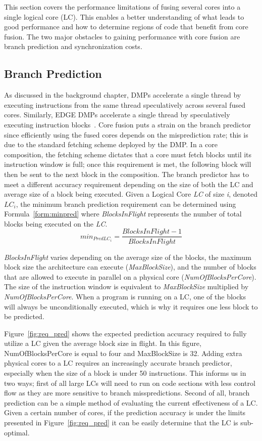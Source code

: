 This section covers the performance limitations of fusing several cores into a single logical core (LC).
This enables a better understanding of what leads to good performance and how to determine regions of code that benefit from core fusion.
The two major obstacles to gaining performance with core fusion are branch prediction and synchronization costs.

\subsection{Branch Prediction}

As discussed in the background chapter, DMPs accelerate a single thread by executing instructions from the same thread speculatively across several fused cores. 
Similarly, EDGE DMPs accelerate a single thread by speculatively executing instruction blocks~\cite{putnam2010e2}.
Core fusion puts a strain on the branch predictor since efficiently using the fused cores depends on the misprediction rate; this is due to the standard fetching scheme deployed by the DMP.
In a core composition, the fetching scheme dictates that a core must fetch blocks until its instruction window is full; once this requirement is met, the following block will then be sent to the next block in the composition.
The branch predictor has to meet a different accuracy requirement depending on the size of both the LC and average size of a block being executed.
Given a Logical Core \textit{LC} of size \textit{i}, denoted \textit{$LC_i$}, the minimum branch prediction requirement can be determined using Formula~\ref{form:minpred} where \textit{BlocksInFlight} represents the number of total blocks being executed on the \textit{LC}.
\begin{equation}\label{form:minpred}
min_{PredLC_i }= \frac{BlocksInFlight - 1}{BlocksInFlight}
\end{equation}

\textit{BlocksInFlight} varies depending on the average size of the blocks, the maximum block size the architecture can execute (\textit{MaxBlockSize}), and the number of blocks 
that are allowed to execute in parallel on a physical core (\textit{NumOfBlocksPerCore}). 
The size of the instruction window is equivalent to \textit{MaxBlockSize} multiplied by \textit{NumOfBlocksPerCore}.
When a program is running on a LC, one of the blocks will always be unconditionally executed, which is why it requires one less block to be predicted.

Figure~\ref{fig:req_pred} shows the expected prediction accuracy required to fully utilize a LC given the average block size in flight.
In this figure, NumOfBlocksPerCore is equal to four and MaxBlockSize is 32.
Adding extra physical cores to a LC requires an increasingly accurate branch predictor, especially when the size of a block is under 50 instructions.
This informs us in two ways; first of all large LCs will need to run on code sections with less control flow as they are more sensitive to branch misspredictions.
Second of all, branch prediction can be a simple method of evaluating the current effectiveness of a LC.
Given a certain number of cores, if the prediction accuracy is under the limits presented in Figure~\ref{fig:req_pred} it can be easily determine that the LC is sub-optimal.

